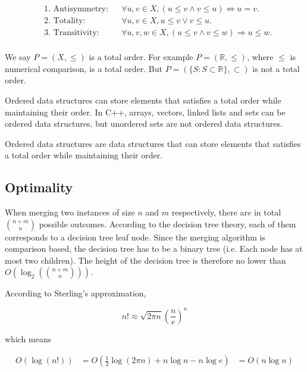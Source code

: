 \documentclass[12pt]{article}
\begin{document}
\begin{align*}
&\text{1. Antisymmetry:} && \forall u, v \in X, (u \le v \land v \le u) \Leftrightarrow u = v. \\
&\text{2. Totality:} && \forall u, v \in X, u \le v \lor v \le u. \\
&\text{3. Transitivity:} && \forall u, v, w \in X, (u \le v \land v \le w) \Rightarrow u \le w.\\
\end{align*}

We say $P = (X, \le)$ is a total order. For example $P = (\mathbb{R}, \le)$, where $\le$ is numerical comparison, is a total order. But $P = (\{S: S\subset \mathbb{R}\}, \subset)$ is not a total order.

Ordered data structures can store elements that satisfies a total order while maintaining their order. In C++, arrays, vectors, linked lists and sets can be ordered data structures, but unordered sets are not ordered data structures.

\begin{tcolorbox}[title=Definition]
    Ordered data structures are data structures that can store elements that satisfies a total order while maintaining their order.
\end{tcolorbox}

\subsection{Optimality}
 
When merging two instances of size $n$ and $m$ respectively, there are in total $\binom{n+m}{n}$ possible outcomes. According to the decision tree theory, each of them corresponds to a decision tree leaf node. Since the merging algorithm is comparison based, the decision tree has to be a binary tree (i.e. Each node has at most two children). The height of the decision tree is therefore no lower than $O(\log_2({\binom{n+m}{n}}))$.

According to Sterling's approximation, 

\begin{equation}
    n!\approx \sqrt{2\pi n}(\frac{n}{e})^n
\end{equation}

which means

\begin{equation}
    \begin{aligned}
        O(\log(n!)) &= O(\frac{1}{2}\log(2\pi n) + n\log n - n\log e )
                    &= O(n\log n)
    \end{aligned}
\end{equation}
\end{document}
